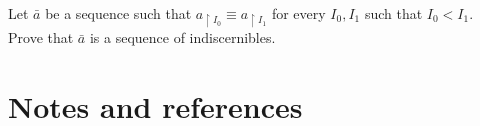 




% 



% 


\begin{exercise}
  Let $\bar a$ be a sequence such that $a_{\restriction I_0}\equiv a_{\restriction I_1}$ for every $I_0,I_1$ such that $I_0<I_1$.
  Prove that $\bar a$ is a sequence of indiscernibles.
  \end{exercise}


  \section{Notes and references}

  
  \begin{biblist}[]\normalsize
    
  \end{biblist}

  